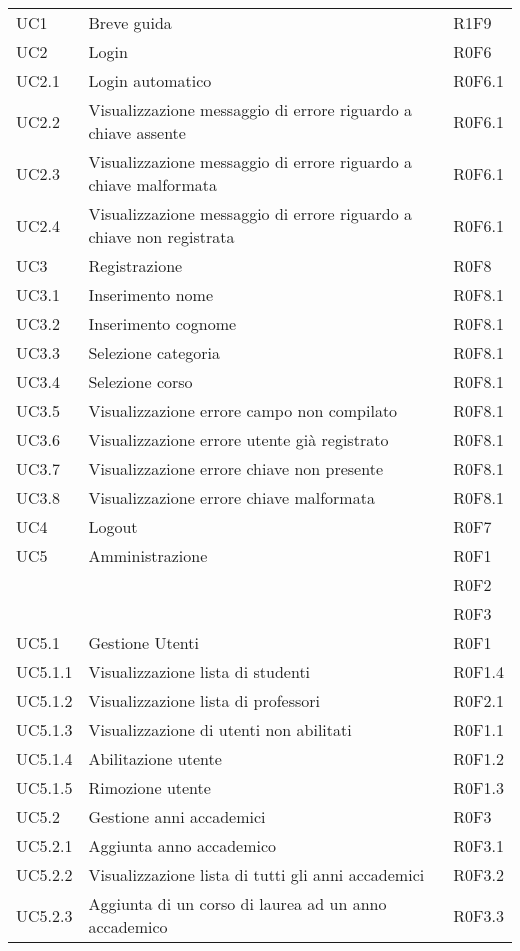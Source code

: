 \documentclass[AnalisiDeiRequisiti.tex]{subfiles}
\begin{document}
\begin{longtable}[H]{p{2cm}p{5cm}p{5cm}}
	UC1 & Breve guida & R1F9 \\  
	UC2 & Login & R0F6 \\  
	UC2.1 & Login automatico & R0F6.1 \\  
	UC2.2 & Visualizzazione messaggio di errore riguardo a chiave assente & R0F6.1 \\  
	UC2.3 & Visualizzazione messaggio di errore riguardo a chiave malformata & R0F6.1 \\  
	UC2.4 & Visualizzazione messaggio di errore riguardo a chiave non registrata & R0F6.1 \\  
	UC3 & Registrazione & R0F8 \\   %
	UC3.1 & Inserimento nome & R0F8.1 \\  
	UC3.2 & Inserimento cognome & R0F8.1 \\  
	UC3.3 & Selezione categoria & R0F8.1 \\  
	UC3.4 & Selezione corso & R0F8.1 \\  
	UC3.5 & Visualizzazione errore campo non compilato & R0F8.1 \\  
	UC3.6 & Visualizzazione errore utente già registrato & R0F8.1 \\  
	UC3.7 & Visualizzazione errore chiave non presente & R0F8.1 \\  
	UC3.8 & Visualizzazione errore chiave malformata & R0F8.1 \\  
	UC4 & Logout & R0F7 \\  
	UC5 & Amministrazione &  R0F1 \\ 
	& & R0F2 \\
	& & R0F3 \\  
	UC5.1 & Gestione Utenti &  R0F1 \\  
	UC5.1.1 & Visualizzazione lista di studenti & R0F1.4 \\  
	UC5.1.2 & Visualizzazione lista di professori &  R0F2.1\\  
	UC5.1.3 & Visualizzazione di utenti non abilitati & R0F1.1 \\  
	UC5.1.4 & Abilitazione utente & R0F1.2 \\    
	UC5.1.5 & Rimozione utente & R0F1.3 \\  
	UC5.2 & Gestione anni accademici &  R0F3 \\  
	UC5.2.1 & Aggiunta anno accademico &  R0F3.1 \\  
	UC5.2.2 & Visualizzazione lista di tutti gli anni accademici & R0F3.2 \\  
	UC5.2.3 & Aggiunta di un corso di laurea ad un anno accademico & R0F3.3 \\  

\end{longtable}
\end{document}
